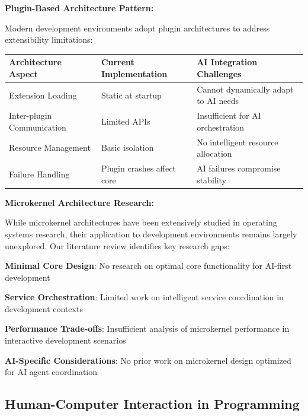 \textbf{Plugin-Based Architecture Pattern:}

Modern development environments adopt plugin architectures to address extensibility limitations:

\begin{center}
\begin{tabular}{@{}lll@{}}
\toprule
\textbf{Architecture Aspect} & \textbf{Current Implementation} & \textbf{AI Integration Challenges} \\
\midrule
Extension Loading & Static at startup & Cannot dynamically adapt to AI needs \\
Inter-plugin Communication & Limited APIs & Insufficient for AI orchestration \\
Resource Management & Basic isolation & No intelligent resource allocation \\
Failure Handling & Plugin crashes affect core & AI failures compromise stability \\
\bottomrule
\end{tabular}
\label{tab:plugin-limitations}
\end{center}

\textbf{Microkernel Architecture Research:}

While microkernel architectures have been extensively studied in operating systems research, their application to development environments remains largely unexplored. Our literature review identifies key research gaps:

\begin{expandedlist}
    \item \textbf{Minimal Core Design}: No research on optimal core functionality for AI-first development
    \item \textbf{Service Orchestration}: Limited work on intelligent service coordination in development contexts
    \item \textbf{Performance Trade-offs}: Insufficient analysis of microkernel performance in interactive development scenarios
    \item \textbf{AI-Specific Considerations}: No prior work on microkernel design optimized for AI agent coordination
\end{expandedlist}

\subsection{Human-Computer Interaction in Programming}
\label{subsec:hci-programming}


